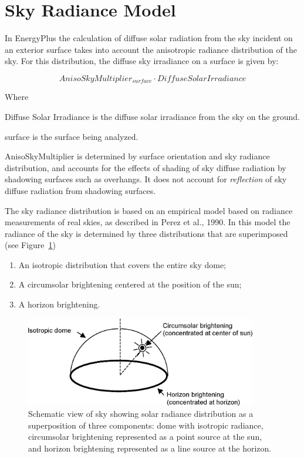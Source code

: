 \section{Sky Radiance Model}\label{sky-radiance-model}

In EnergyPlus the calculation of diffuse solar radiation from the sky incident on an exterior surface takes into account the anisotropic radiance distribution of the sky. For this distribution, the diffuse sky irradiance on a surface is given by:

\begin{equation}
AnisoSkyMultiplie{r_{surface}}\cdot DiffuseSolarIrradiance
\end{equation}

Where

Diffuse Solar Irradiance is the diffuse solar irradiance from the sky on the ground.

surface is the surface being analyzed.

AnisoSkyMultiplier is determined by surface orientation and sky radiance distribution, and accounts for the effects of shading of sky diffuse radiation by shadowing surfaces such as overhangs. It does not account for \emph{reflection} of sky diffuse radiation from shadowing surfaces.

The sky radiance distribution is based on an empirical model based on radiance measurements of real skies, as described in Perez et al., 1990. In this model the radiance of the sky is determined by three distributions that are superimposed (see Figure~\ref{fig:schematic-view-of-sky-showing-solar-radiance})

\begin{enumerate}
\def\labelenumi{(\arabic{enumi})}
\item
  An isotropic distribution that covers the entire sky dome;
\item
  A circumsolar brightening centered at the position of the sun;
\item
  A horizon brightening.
\end{enumerate}

\begin{figure}[hbtp] %
\centering
\includegraphics[width=0.9\textwidth, height=0.9\textheight, keepaspectratio=true]{media/image589.png}
\caption{Schematic view of sky showing solar radiance distribution as a superposition of three components: dome with isotropic radiance, circumsolar brightening represented as a point source at the sun, and horizon brightening represented as a line source at the horizon. \protect \label{fig:schematic-view-of-sky-showing-solar-radiance}}
\end{figure}

